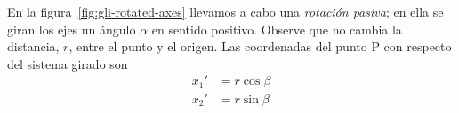 En la figura~\ref{fig:gli-rotated-axes} llevamos a cabo una \emph{rotación
  pasiva}\footnotemark{}; en ella se giran los ejes un ángulo $\alpha$
en sentido positivo. Observe que no cambia la distancia, $r$, entre el punto
y el origen.
Las coordenadas del punto P con respecto del sistema girado son
\begin{subequations}
  \begin{align}\label{eq:gli-coordxprimauno}
    x_1' &= r \cos\beta\\
    \label{eq:gli-coordxprimados}
    x_2' &= r \sin\beta
  \end{align}
\end{subequations}

%
%
%
